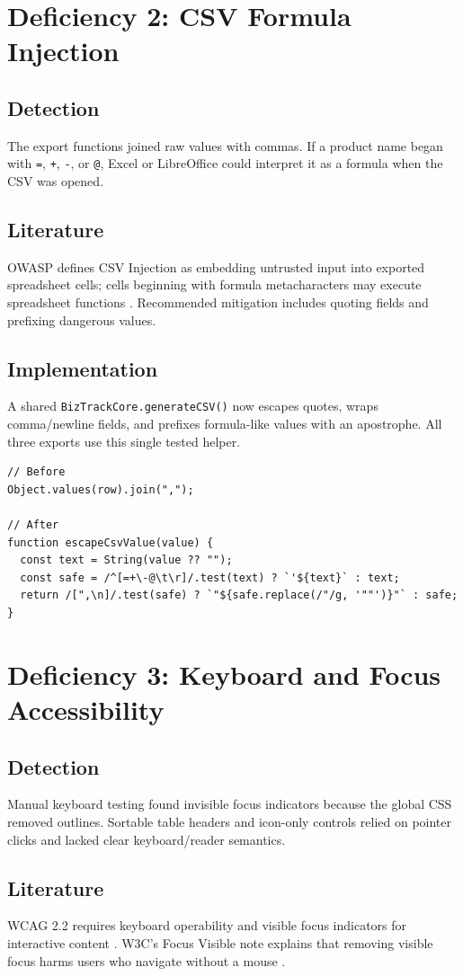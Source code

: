 \documentclass[12pt]{article}
\begin{document}
\section{Deficiency 2: CSV Formula Injection}
\subsection{Detection}
The export functions joined raw values with commas. If a product name began with \texttt{=}, \texttt{+}, \texttt{-}, or \texttt{@}, Excel or LibreOffice could interpret it as a formula when the CSV was opened.
\subsection{Literature}
OWASP defines CSV Injection as embedding untrusted input into exported spreadsheet cells; cells beginning with formula metacharacters may execute spreadsheet functions \cite{owasp-csv}. Recommended mitigation includes quoting fields and prefixing dangerous values.
\subsection{Implementation}
A shared \texttt{BizTrackCore.generateCSV()} now escapes quotes, wraps comma/newline fields, and prefixes formula-like values with an apostrophe. All three exports use this single tested helper.
\begin{lstlisting}[caption={Before and after: CSV export}]
// Before
Object.values(row).join(",");

// After
function escapeCsvValue(value) {
  const text = String(value ?? "");
  const safe = /^[=+\-@\t\r]/.test(text) ? `'${text}` : text;
  return /[",\n]/.test(safe) ? `"${safe.replace(/"/g, '""')}"` : safe;
}
\end{lstlisting}

\section{Deficiency 3: Keyboard and Focus Accessibility}
\subsection{Detection}
Manual keyboard testing found invisible focus indicators because the global CSS removed outlines. Sortable table headers and icon-only controls relied on pointer clicks and lacked clear keyboard/reader semantics.
\subsection{Literature}
WCAG 2.2 requires keyboard operability and visible focus indicators for interactive content \cite{wcag22}. W3C's Focus Visible note explains that removing visible focus harms users who navigate without a mouse \cite{wai-focus}.
\end{document}
